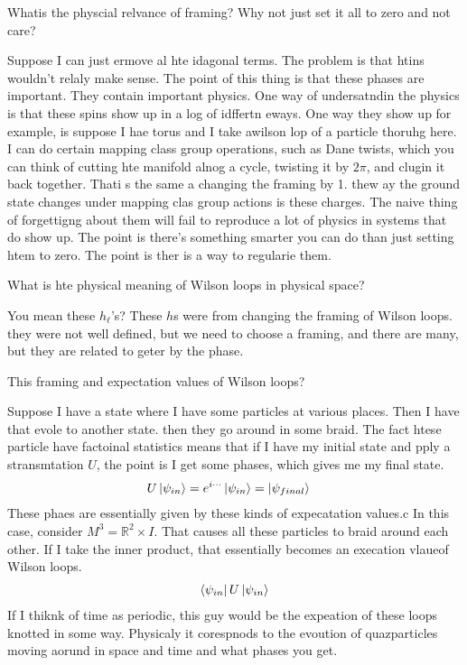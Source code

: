 \begin{question}
    Whatis the physcial relvance of framing?
    Why not just set it all to zero and not care?
\end{question}
Suppose I can just ermove al hte idagonal terms.
The problem is that htins wouldn't relaly make sense.
The point of this thing is that these phases are important.
They contain important physics.
One way of undersatndin the physics is that these spins show up in a log of
idffertn eways.
One way they show up for example,
is suppose I hae torus and I take awilson lop of a particle thoruhg here.
I can do certain mapping class group operations,
such as Dane twists,
which you can think of cutting hte manifold alnog a cycle,
twisting it by $2\pi$,
and clugin it back together.
Thati s the same a changing the framing by 1.
thew ay the ground state changes under mapping clas group actions
is these charges.
The naive thing of forgettigng about them will fail to reproduce a lot of
physics in systems that do show up.
The point is there's something smarter you can do than just setting htem to
zero.
The point is ther is a way to regularie them.

\begin{question}
    What is hte physical meaning of Wilson loops in physical space?
\end{question}
You mean these $h_\ell$'s?
These $h$s were from changing the framing of Wilson loops.
they were not well defined,
but we need to choose a framing,
and there are many,
but they are related to geter by the phase.

\begin{question}
    This framing and expectation values of Wilson loops?
\end{question}
Suppose I have a state where I have some particles at various places.
Then I have that evole to another state.
then they go around in some braid.
The fact htese particle have factoinal statistics means
that if I have my initial state and pply a stransmtation $U$,
the point is I get some phases,
which gives me my final state.
\begin{align}
    U\ket{\psi_{in}}
    &=
    e^{i \cdots}
    \ket{\psi_{in}}
    =
    \ket{\psi_{final}}
\end{align}
These phaes are essentially given by these kinds of expecatation values.c
In this case,
consider $M^3=\mathbb{R}^2\times I$.
That causes all these particles to braid around each other.
If I take the inner product,
that essentially becomes an execation vlaueof Wilson loops.
\begin{align}
    \bra{\psi_{in}}U\ket{\psi_{in}}
\end{align}
If I thiknk of time as periodic,
this guy would be the expeation of these loops knotted in some way.
Physicaly it corespnods to the evoution of quazparticles moving aorund in space
and time and what phases you get.

